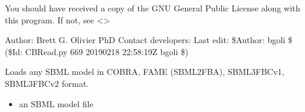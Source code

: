\documentclass[letterpaper,10pt,english]{sphinxmanual}
\begin{document}
\sphinxAtStartPar
You should have received a copy of the GNU General Public License
along with this program.  If not, see \textless{}\textgreater{}

\sphinxAtStartPar
Author: Brett G. Olivier PhD
Contact developers: 
Last edit: \$Author: bgoli \$ (\$Id: CBRead.py 669 2019\sphinxhyphen{}02\sphinxhyphen{}18 22:58:19Z bgoli \$)

\begin{fulllineitems}
\label{\detokenize{modules_doc:cbmpy.CBRead.loadModel}}
\pysigstartsignatures
{}
\pysigstopsignatures
\sphinxAtStartPar
Loads any SBML model in COBRA, FAME (SBML2FBA), SBML3FBCv1, SBML3FBCv2 format.
\begin{itemize}
\item {} 
\sphinxAtStartPar
{} an SBML model file

\end{itemize}

\end{fulllineitems}

\end{document}

